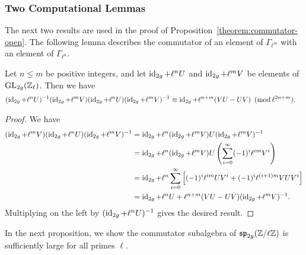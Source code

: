\subsubsection{Two Computational Lemmas}\label{sec2}

The next two results are used in the proof of Proposition~\ref{theorem:commutator-open}. The following lemma describes the commutator of an element of $\Gamma_{\ell^m}$ with an element of $\Gamma_{\ell^n}$.

	\begin{lemma} \label{lemma:commutator-formula}
		Let $n\le m$ be positive integers, and let $\operatorname{id}_{2g} + \ell^n U$ and $\operatorname{id}_{2g} + \ell^m V$ be elements of $\operatorname{GL}_{2g}({\mathbb Z}_\ell)$. Then we have
		\begin{align*}
		& (\operatorname{id}_{2g} + \ell^nU)^{-1}(\operatorname{id}_{2g} + \ell^mV)(\operatorname{id}_{2g} + \ell^n U)(\operatorname{id}_{2g} + \ell^m V)^{-1} \equiv \operatorname{id}_{2g} + \ell^{n+m} (VU - UV)\,\,\, (\operatorname{mod}{\ell^{2n+m}}).
		\end{align*}
	\end{lemma}
	\begin{proof}
		We have
		\begin{align*}
		(\operatorname{id}_{2g} + \ell^mV)(\operatorname{id}_{2g} + \ell^n U)(\operatorname{id}_{2g} + \ell^mV)^{-1} &= \operatorname{id}_{2g} + \ell^n (\operatorname{id}_{2g} + \ell^mV)U(\operatorname{id}_{2g} + \ell^mV)^{-1} \\			
		&= \operatorname{id}_{2g} + \ell^n (\operatorname{id}_{2g} + \ell^m V)U \left(\sum_{i=0}^\infty (-1)^i \ell^{im} V^i\right) \\
		&= \operatorname{id}_{2g} + \ell^n \sum_{i=0}^\infty \Big[ (-1)^i \ell^{im} U V^i + (-1)^i \ell^{(i+1)m} VUV^i \Big]\\
		&= \operatorname{id}_{2g} + \ell^n U + \ell^{n+m} (VU - UV) (\operatorname{id}_{2g} + \ell^m V)^{-1}.
		\end{align*}
		Multiplying on the left by $(\operatorname{id}_{2g} + \ell^nU)^{-1}$ gives the desired result.
	\end{proof}

In the next proposition, we show the commutator subalgebra of $\mathfrak{sp}_{2g}(\mathbb Z/\ell \mathbb Z)$ is sufficiently large for all primes $\ell$.

